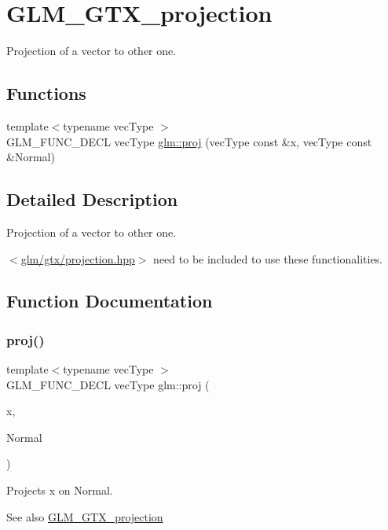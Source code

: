 \hypertarget{group__gtx__projection}{}\section{G\+L\+M\+\_\+\+G\+T\+X\+\_\+projection}
\label{group__gtx__projection}


Projection of a vector to other one.  


\subsection*{Functions}
\begin{DoxyCompactItemize}
\item 
{\footnotesize template$<$typename vec\+Type $>$ }\\G\+L\+M\+\_\+\+F\+U\+N\+C\+\_\+\+D\+E\+CL vec\+Type \hyperlink{group__gtx__projection_gadf29123bcf748fc9d6fb0998192184cf}{glm\+::proj} (vec\+Type const \&x, vec\+Type const \&Normal)
\end{DoxyCompactItemize}


\subsection{Detailed Description}
Projection of a vector to other one. 

$<$\hyperlink{projection_8hpp}{glm/gtx/projection.\+hpp}$>$ need to be included to use these functionalities. 

\subsection{Function Documentation}
\mbox{\label{group__gtx__projection_gadf29123bcf748fc9d6fb0998192184cf}} 
\subsubsection{\texorpdfstring{proj()}{proj()}}
{\footnotesize\ttfamily template$<$typename vec\+Type $>$ \\
G\+L\+M\+\_\+\+F\+U\+N\+C\+\_\+\+D\+E\+CL vec\+Type glm\+::proj (\begin{DoxyParamCaption}\item[{vec\+Type const \&}]{x,  }\item[{vec\+Type const \&}]{Normal }\end{DoxyParamCaption})}

Projects x on Normal.

\begin{DoxySeeAlso}{See also}
\hyperlink{group__gtx__projection}{G\+L\+M\+\_\+\+G\+T\+X\+\_\+projection} 
\end{DoxySeeAlso}

